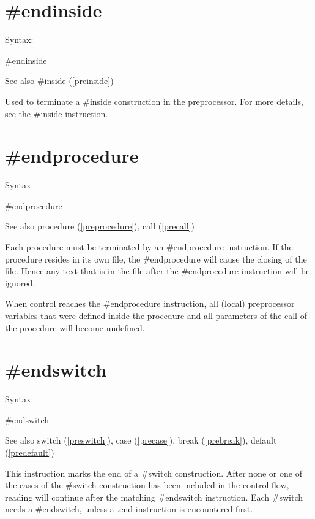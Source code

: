 
\section{\#endinside}
\label{preendinside}

\noindent Syntax:

\#endinside
 
\noindent See also \#inside (\ref{preinside})

\noindent Used to terminate a \#inside construction in 
the preprocessor. For more details, see the \#inside 
instruction.


\section{\#endprocedure}
\label{preendprocedure}

\noindent Syntax:

\#endprocedure
 
\noindent See also procedure (\ref{preprocedure}), call
(\ref{precall})

\noindent Each procedure must be terminated by an 
\#endprocedure instruction. If the procedure resides 
in its own file, the \#endprocedure will cause the closing of the file. 
Hence any text that is in the file after the \#endprocedure instruction 
will be ignored.

When control reaches the \#endprocedure instruction, all (local) 
preprocessor variables that were defined 
inside the procedure and all parameters of the call of the procedure will 
become undefined.


\section{\#endswitch}
\label{preendswitch}

\noindent Syntax:

\#endswitch
 
\noindent See also switch (\ref{preswitch}),
        case (\ref{precase}),
        break (\ref{prebreak}),
        default (\ref{predefault})

\noindent This instruction marks the end of a 
\#switch construction. After none or one of the cases of 
the \#switch construction has been included in the control flow, reading 
will continue after the matching \#endswitch instruction. Each \#switch 
needs a \#endswitch, unless a .end instruction is encountered first.

